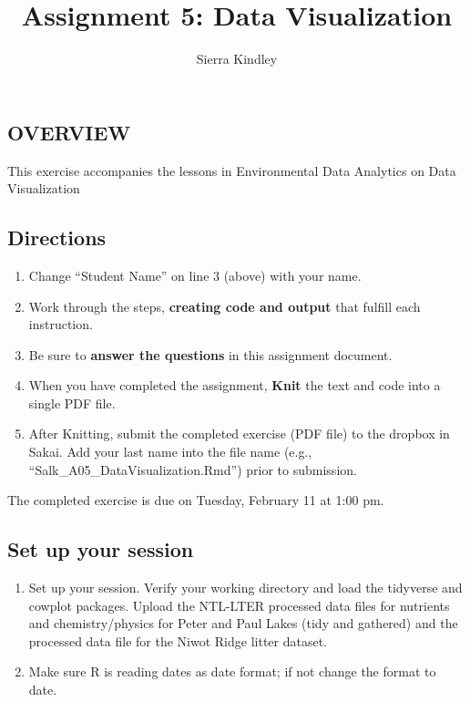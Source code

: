 \documentclass[
]{article}
\title{Assignment 5: Data Visualization}
\author{Sierra Kindley}
\date{}
\providecommand{\tightlist}{%
  \setlength{\itemsep}{0pt}\setlength{\parskip}{0pt}}
\begin{document}
\maketitle

\hypertarget{overview}{%
\subsection{OVERVIEW}\label{overview}}

This exercise accompanies the lessons in Environmental Data Analytics on
Data Visualization

\hypertarget{directions}{%
\subsection{Directions}\label{directions}}

\begin{enumerate}
\def\labelenumi{\arabic{enumi}.}
\tightlist
\item
  Change ``Student Name'' on line 3 (above) with your name.
\item
  Work through the steps, \textbf{creating code and output} that fulfill
  each instruction.
\item
  Be sure to \textbf{answer the questions} in this assignment document.
\item
  When you have completed the assignment, \textbf{Knit} the text and
  code into a single PDF file.
\item
  After Knitting, submit the completed exercise (PDF file) to the
  dropbox in Sakai. Add your last name into the file name (e.g.,
  ``Salk\_A05\_DataVisualization.Rmd'') prior to submission.
\end{enumerate}

The completed exercise is due on Tuesday, February 11 at 1:00 pm.

\hypertarget{set-up-your-session}{%
\subsection{Set up your session}\label{set-up-your-session}}

\begin{enumerate}
\def\labelenumi{\arabic{enumi}.}
\item
  Set up your session. Verify your working directory and load the
  tidyverse and cowplot packages. Upload the NTL-LTER processed data
  files for nutrients and chemistry/physics for Peter and Paul Lakes
  (tidy and gathered) and the processed data file for the Niwot Ridge
  litter dataset.
\item
  Make sure R is reading dates as date format; if not change the format
  to date.
\end{enumerate}
\end{document}
